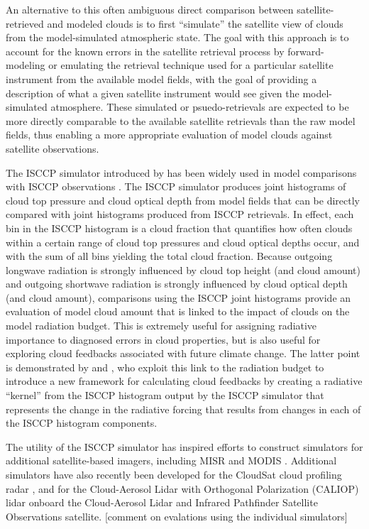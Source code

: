 An alternative to this often ambiguous direct comparison between satellite-retrieved and modeled clouds is to first ``simulate'' the satellite view of clouds from the model-simulated atmospheric state. The goal with this approach is to account for the known errors in the satellite retrieval process by forward-modeling or emulating the retrieval technique used for a particular satellite instrument from the available model fields, with the goal of providing a description of what a given satellite instrument would see given the model-simulated atmosphere. These simulated or psuedo-retrievals are expected to be more directly comparable to the available satellite retrievals than the raw model fields, thus enabling a more appropriate evaluation of model clouds against satellite observations.

The ISCCP simulator introduced by \cite{klein_and_jakob_1999} has been widely used in model comparisons with ISCCP observations \citep{webb_et_al_2001, norris_and_weaver_2001, lin_and_zhang_2004, zhang_et_al_2005, wyant_et_al_2006, klein_et_al_2013}. The ISCCP simulator produces joint histograms of cloud top pressure and cloud optical depth from model fields that can be directly compared with joint histograms produced from ISCCP retrievals. In effect, each bin in the ISCCP histogram is a cloud fraction that quantifies how often clouds within a certain range of cloud top pressures and cloud optical depths occur, and with the sum of all bins yielding the total cloud fraction. Because outgoing longwave radiation is strongly influenced by cloud top height (and cloud amount) and outgoing shortwave radiation is strongly influenced by cloud optical depth (and cloud amount), comparisons using the ISCCP joint histograms provide an evaluation of model cloud amount that is linked to the impact of clouds on the model radiation budget. This is extremely useful for assigning radiative importance to diagnosed errors in cloud properties, but is also useful for exploring cloud feedbacks associated with future climate change. The latter point is demonstrated by \cite{zelinka_et_al_2012a} and \cite{zelinka_et_al_2012b}, who exploit this link to the radiation budget to introduce a new framework for calculating cloud feedbacks by creating a radiative ``kernel'' from the ISCCP histogram output by the ISCCP simulator that represents the change in the radiative forcing that results from changes in each of the ISCCP histogram components.  

The utility of the ISCCP simulator has inspired efforts to construct simulators for additional satellite-based imagers, including MISR \citep{marchand_and_ackerman_2010} and MODIS \citep{pincus_et_al_2012}. Additional simulators have also recently been developed for the CloudSat \citep{stephens_et_al_2002} cloud profiling radar \citep[Quickbeam;][]{haynes_et_al_2007}, and for the Cloud-Aerosol Lidar with Orthogonal Polarization (CALIOP) lidar \citep{chepfer_et_al_2008} onboard the Cloud-Aerosol Lidar and Infrared Pathfinder Satellite Observations \citep[CALIPSO][]{winker_et_al_2007} satellite. [comment on evalations using the individual simulators]

